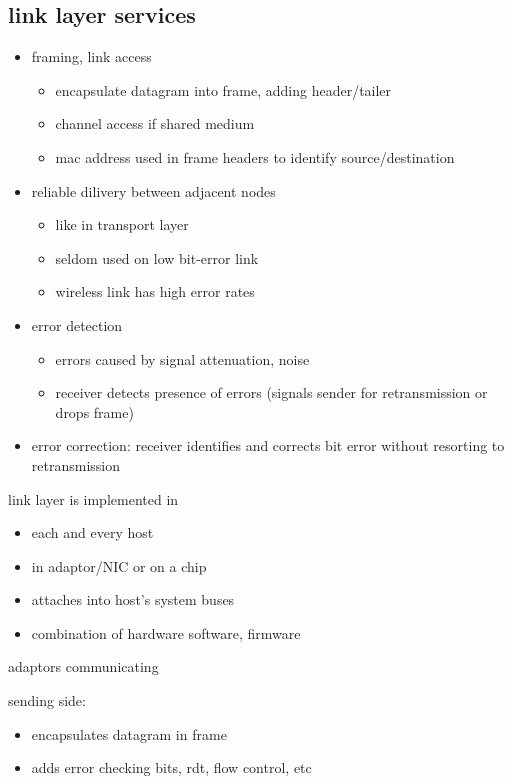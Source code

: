 \documentclass[10pt]{article}
\theoremstyle{break}
\begin{document}
\subsection{link layer services}
\begin{itemize}
    \item framing, link access \begin{itemize}
        \item encapsulate datagram into frame, adding header/tailer 
        \item channel access if shared medium 
        \item mac address used in frame headers to identify source/destination
    \end{itemize}
    \item reliable dilivery between adjacent nodes \begin{itemize}
        \item like in transport layer 
        \item seldom used on low bit-error link 
        \item wireless link has high error rates 
    \end{itemize}
    \item error detection \begin{itemize}
        \item errors caused by signal attenuation, noise 
        \item receiver detects presence of errors (signals sender for retransmission or drops frame)
    \end{itemize}
    \item error correction: receiver identifies and corrects bit error without resorting to retransmission
\end{itemize}


link layer is implemented in
\begin{itemize}
    \item each and every host
    \item in adaptor/NIC or on a chip  
    \item attaches into host's system buses 
    \item combination of hardware software, firmware
\end{itemize}

adaptors communicating 

sending side:
\begin{itemize}
    \item encapsulates datagram in frame 
    \item adds error checking bits, rdt, flow control, etc 
\end{itemize}
\end{document}

